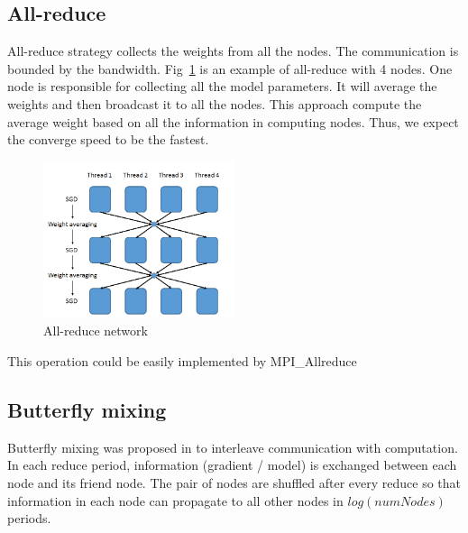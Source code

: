 \documentclass{article}
\begin{document}
\subsection{All-reduce}
All-reduce strategy collects the weights from all the nodes. The communication is bounded by 
the bandwidth. Fig~\ref{fig:allreduce} is an example of all-reduce with 4 nodes. One node is responsible for
collecting all the model parameters. It will average the weights and then broadcast it to all the nodes. 
This approach compute the average weight based on all the information in computing nodes. Thus, we expect 
the converge speed to be the fastest.
\begin{figure}[htb]
  \centering
  \includegraphics[width=0.5\textwidth]{allreduce.png}
  \caption{All-reduce network}
  \label{fig:allreduce}
\end{figure}

This operation could be easily implemented by MPI\_Allreduce

\subsection{Butterfly mixing}
Butterfly mixing was proposed in \cite{zhao2013butterfly} to interleave communication with computation. In each
reduce period, information (gradient / model) is exchanged between each node and its friend node. The pair of nodes
are shuffled after every reduce so that information in each node can propagate to all other nodes in $log(numNodes)$ periods.
\end{document}
